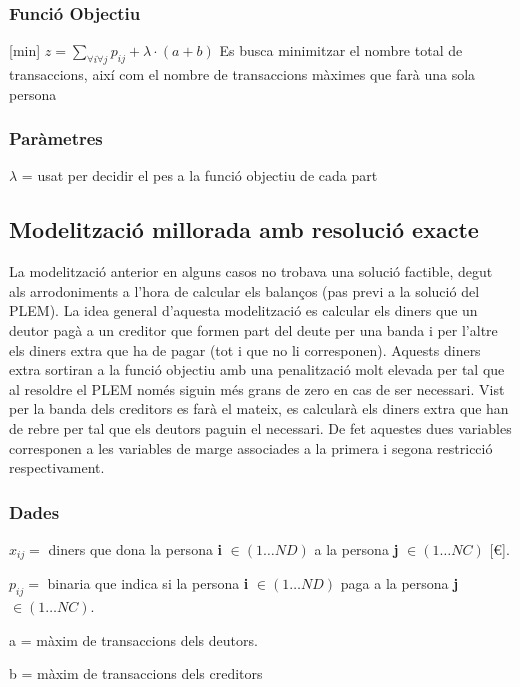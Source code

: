 \subsubsection{Funció Objectiu}
[min] $z = \sum\limits_{\forall i \forall j} p_{ij} + \lambda \cdot (a+b)$
Es busca minimitzar el nombre total de transaccions, així com el nombre de transaccions màximes que farà una sola persona
\subsubsection{Paràmetres}
$\lambda$ = usat per decidir el pes a la funció objectiu de cada part

\subsection{Modelització millorada amb resolució exacte}
La modelització anterior en alguns casos no trobava una solució factible, degut als arrodoniments a l'hora de calcular els balanços (pas previ a la solució del \ac{PLEM}).
La idea general d'aquesta modelització es calcular els diners que un deutor pagà a un creditor que formen part del deute per una banda i per l'altre els diners extra que ha de pagar (tot i que no li corresponen). Aquests diners extra sortiran a la funció objectiu amb una penalització molt elevada per tal que al resoldre el \ac{PLEM} només siguin més grans de zero en cas de ser necessari. Vist per la banda dels creditors es farà el mateix, es calcularà els diners extra que han de rebre per tal que els deutors paguin el necessari. De fet aquestes dues variables corresponen a les variables de marge associades a la primera i segona restricció respectivament.

\subsubsection{Dades}
\begin{description}
\item $x_{ij}=$ diners que dona la persona \textbf{i} $\in (1 \ldots ND)$ a la persona \textbf{j} $\in (1 \ldots NC)$  [€].
\item $p_{ij}=$ binaria que indica si la persona \textbf{i} $\in (1 \ldots ND)$ paga a la persona \textbf{j} $\in (1 \ldots NC)$.
\item a = màxim de transaccions dels deutors.
\item b = màxim de transaccions dels creditors
\end{description}

